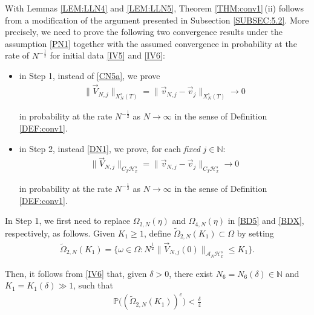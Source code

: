 \documentclass[letterpaper, 11pt,  reqno]{amsart}
\newcommand{\1}{\hspace{0.5mm}\text{I}\hspace{0.2mm}}
\newcommand{\noi}{\noindent}
\newcommand{\N}{\mathbb{N}}
\newcommand{\PP}{\mathbb{P}}
\renewcommand{\H}{\mathcal{H}}
\newcommand{\dl}{\delta}
\newcommand{\wt}{\widetilde}
\newcommand{\A}{\mathcal{A}}
\newcommand{\too}{\longrightarrow}
\renewcommand{\O}{\Omega}
\renewcommand{\o}{\omega}
\numberwithin{equation}{section}
\numberwithin{theorem}{section}
\begin{document}
With Lemmas \ref{LEM:LLN4} and 
\ref{LEM:LLN5}, 
Theorem \ref{THM:conv1}\,(ii)
follows from 
a  modification of the argument presented in Subsection \ref{SUBSEC:5.2}.
More precisely, 
we need to prove the following two convergence results under the assumption \eqref{PN1}
together with 
the assumed convergence
in probability at the rate of $N^{-\frac 12 }$ for
initial data \eqref{IV5} and \eqref{IV6}:

\smallskip

\begin{itemize}
\item[(i)]


in Step 1, instead of \eqref{CN5a}, we
prove 
\begin{align}
\| \vec V_{N, j} \|_{X^s_N(T)}
=  \| \vec v_{N, j}  - \vec v_j \|_{X^s_N(T)}
\too 0  
\label{BZ0a}
\end{align}

\noi
in probability at the rate $N^{-\frac 12 }$ as $N \to \infty$
in the sense of Definition \ref{DEF:conv1}.

\medskip
\item[(ii)]
 in Step 2, 
instead  \eqref{DN1}, 
we prove, for each {\it fixed}  $j \in \N$:
\begin{align}
\| \vec V_{N, j} \|_{C_T \H_x^s}
=  \| \vec v_{N, j}  - \vec v_j \|_{C_T \H_x^s}
\too 0  
\label{BZ0b}
\end{align}

\noi
in probability  at the rate $N^{-\frac 12 }$
as $N \to \infty$ 
in the sense of Definition \ref{DEF:conv1}.
\end{itemize}


\smallskip






In Step 1, 
we first need to replace
$\O_{2, N}(\eta)$ 
and 
$\O_{4, N}(\eta)$ in 
 \eqref{BD5}
and \eqref{BDX}, respectively, as follows.
Given  $K_1 \ge 1$,  
define $\wt \O_{2, N}(K_1)\subset \O$ by setting 
\begin{align}
\wt \O_{2, N}(K_1) = \big\{ \o \in \O: 
N^{\frac 12 } \|\vec  V_{N, j} (0)\|_{\A_N \H^s_x} 
\le 
K_1 \Big\}.
\label{BZ1a}
\end{align}

\noi
Then, it follows from 
\eqref{IV6}
that, given $\dl > 0$,  there exist 
$N_6 = N_6(\dl) \in \N$ and  $K_1  =K_1(\dl) \gg1$, 
 such that 
\begin{align}
\PP\big( (\wt \O_{2, N}(K_1))^c \big) < \frac \dl 4
\label{BZ1b}
\end{align}
\end{document}
